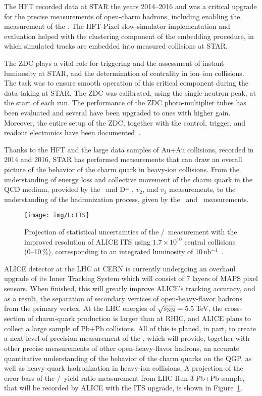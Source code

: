 The HFT recorded data at STAR the years 2014--2016 and was a critical upgrade for the precise measurements of open-charm hadrons, including enabling the measurement of the \Lambdac\@. The HFT-Pixel slow-simulator implementation and evaluation helped with the clustering component of the embedding procedure, in which simulated tracks are embedded into measured collisions at STAR\@. 

The ZDC plays a vital role for triggering and the assessment of instant luminosity at STAR, and the determination of centrality in ion--ion collisions. The task was to ensure smooth operation of this critical component during the data taking at STAR\@. The ZDC was calibrated, using the single-neutron peak, at the start of each run. The performance of the ZDC photo-multiplier tubes has been evaluated and several have been upgraded to ones with higher gain. Moreover, the entire setup of the ZDC, together with the control, trigger, and readout electronics have been documented~\cite{ZDCmanual}\@.

Thanks to the HFT and the large data samples of Au+Au collisions, recorded in 2014 and 2016, STAR has performed measurements that can draw an overall picture of the behavior of the charm quark in heavy-ion collisions. From the understanding of energy loss and collective movement of the charm quark in the QCD medium, provided by the \dzero\ and D$^\pm$ \Raa, $v_2$, and $v_3$ measurements, to the understanding of the hadronization process, given by the \Lambdac\ and \Ds\ measurements.

\begin{figure}[!htb]
\centering
\texttt{[image: img/LcITS]}
\caption[Projection of statistical uncertainties of the \Lambdac/\dzero\ measurement with the improved resolution of ALICE ITS\@.]{Projection of statistical uncertainties of the \Lambdac/\dzero\ measurement with the improved resolution of ALICE ITS using $1.7\times 10^{10}$ central collisions (0--10$\,\%$), corresponding to an integrated luminosity of 10$\,$nb$^{-1}$~\cite{ITS_CDR}.}
\label{ITS_Lc_conclusion}
\end{figure}

ALICE detector at the LHC at CERN is currently undergoing an overhaul upgrade of its Inner Tracking System which will consist of 7 layers of MAPS pixel sensors. When finished, this will greatly improve ALICE's tracking accuracy, and as a result, the separation of secondary vertices of open-heavy-flavor hadrons from the primary vertex. At the LHC energies of $\sqrt{s_\text{NN}} = 5.5\,$TeV, the cross-section of charm-quark production is larger than at RHIC, and ALICE plans to collect a large sample of Pb+Pb collisions. All of this is planed, in part, to create a next-level-of-precision measurement of the \Lambdac, which will provide, together with other precise measurements of other open-heavy-flavor hadrons, an accurate quantitative understanding of the behavior of the charm quarks on the QGP, as well as heavy-quark hadronization in heavy-ion collisions. A projection of the error bars of the \Lambdac/\dzero\ yield ratio measurement from LHC Run-3 Pb+Pb sample, that will be recorded by ALICE with the ITS upgrade, is shown in Figure~\ref{ITS_Lc_conclusion}\@.

